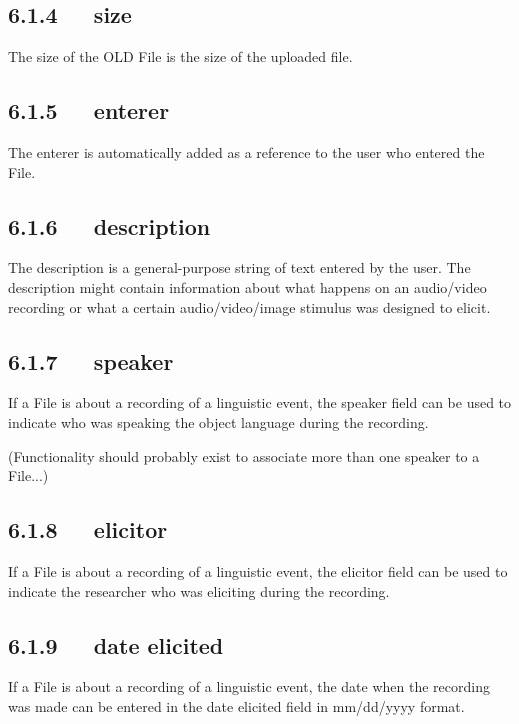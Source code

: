 \documentclass[letterpaper,10pt,english]{sphinxmanual}
\begin{document}
\subsection{6.1.4   size}
\label{documentation:size}
The size of the OLD File is the size of the uploaded file.


\subsection{6.1.5   enterer}
\label{documentation:id2}
The enterer is automatically added as a reference to the user who entered the
File.


\subsection{6.1.6   description}
\label{documentation:description}
The description is a general-purpose string of text entered by the user.  The
description might contain information about what happens on an audio/video
recording or what a certain audio/video/image stimulus was designed to elicit.


\subsection{6.1.7   speaker}
\label{documentation:id3}
If a File is about a recording of a linguistic event, the speaker field can be
used to indicate who was speaking the object language during the recording.

(Functionality should probably exist to associate more than one speaker to a
File...)


\subsection{6.1.8   elicitor}
\label{documentation:id4}
If a File is about a recording of a linguistic event, the elicitor field can be
used to indicate the researcher who was eliciting during the recording.


\subsection{6.1.9   date elicited}
\label{documentation:id5}
If a File is about a recording of a linguistic event, the date when the
recording was made can be entered in the date elicited field in mm/dd/yyyy
format.
\end{document}
